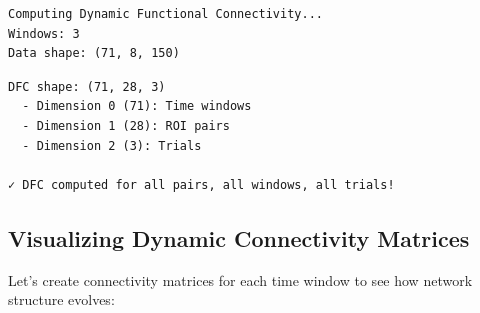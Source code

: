 \documentclass[
  11pt,
  letterpaper,
  oneside,
  openany]{book}
\begin{document}
\begin{verbatim}
Computing Dynamic Functional Connectivity...
Windows: 3
Data shape: (71, 8, 150)
\end{verbatim}

\begin{verbatim}
DFC shape: (71, 28, 3)
  - Dimension 0 (71): Time windows
  - Dimension 1 (28): ROI pairs
  - Dimension 2 (3): Trials

✓ DFC computed for all pairs, all windows, all trials!
\end{verbatim}

\subsection{Visualizing Dynamic Connectivity
Matrices}\label{visualizing-dynamic-connectivity-matrices}

Let's create connectivity matrices for each time window to see how
network structure evolves:
\end{document}
